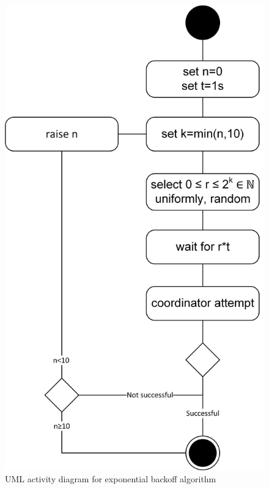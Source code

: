 		\begin{figure}[htbp] %
		\caption{\gls{UML} activity diagram for exponential backoff algorithm} \label{figure:coordinator exponential backoff}
		\includegraphics[scale=0.8]{figures/exponential-backoff.png}
		\end{figure}
		
		
